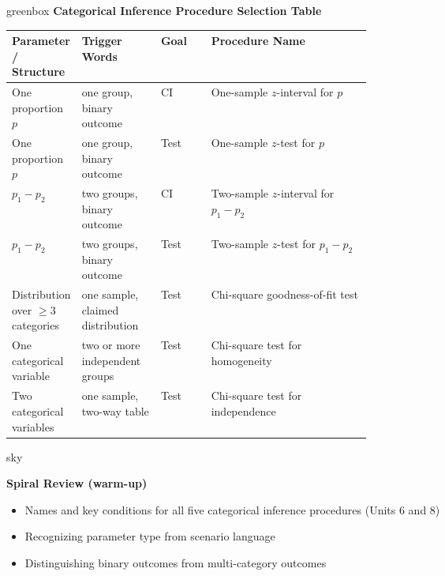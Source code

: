 \documentclass[10pt]{article}
\begin{document}
\begin{skillbox}{greenbox}
\textbf{Categorical Inference Procedure Selection Table}

\medskip
\renewcommand{\arraystretch}{1.8}
\begin{tabularx}{\linewidth}{@{} p{0.17\linewidth} p{0.22\linewidth} p{0.14\linewidth} X @{}}
  \rowcolor{sky}
  \textbf{Parameter / Structure} & \textbf{Trigger Words} & \textbf{Goal} & \textbf{Procedure Name} \\
  \hline
  One proportion $p$ & one group, binary outcome & CI & One-sample $z$-interval for $p$ \\
  One proportion $p$ & one group, binary outcome & Test & One-sample $z$-test for $p$ \\
  $p_1 - p_2$ & two groups, binary outcome & CI & Two-sample $z$-interval for $p_1-p_2$ \\
  $p_1 - p_2$ & two groups, binary outcome & Test & Two-sample $z$-test for $p_1-p_2$ \\
  Distribution over $\ge 3$ categories & one sample, claimed distribution & Test & Chi-square goodness-of-fit test \\
  One categorical variable & two or more independent groups & Test & Chi-square test for homogeneity \\
  Two categorical variables & one sample, two-way table & Test & Chi-square test for independence \\
\end{tabularx}
\end{skillbox}

\begin{skillbox}{sky}
\begin{minipage}[t]{0.55\linewidth}\vspace{0pt}
    \textbf{Spiral Review (warm-up)}
    \begin{itemize}
        \item Names and key conditions for all five categorical inference procedures
              (Units 6 and 8)
        \item Recognizing parameter type from scenario language
        \item Distinguishing binary outcomes from multi-category outcomes
    \end{itemize}
\end{minipage}
\hfill
\begin{minipage}[t]{0.38\linewidth}\vspace{0pt}\centering
\end{minipage}
\end{skillbox}
\end{document}
